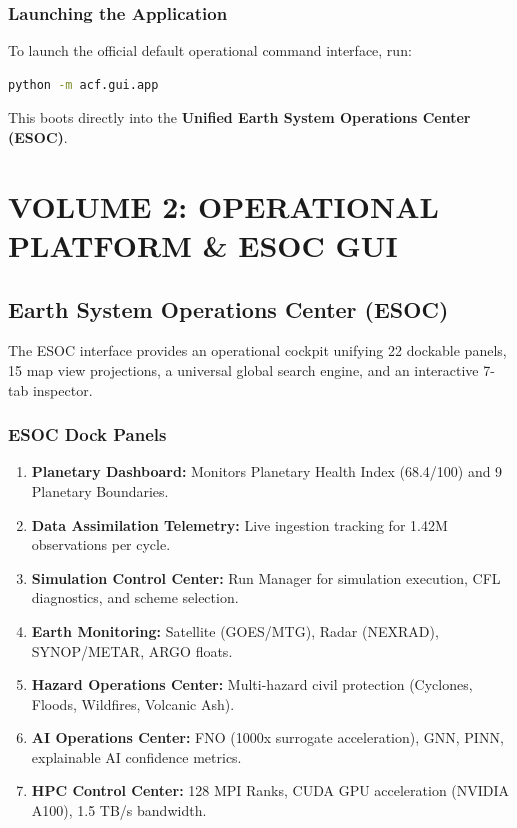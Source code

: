 \documentclass[11pt,a4paper,oneside]{report}
\begin{document}
\section{Launching the Application}
To launch the official default operational command interface, run:
\begin{lstlisting}[language=bash]
python -m acf.gui.app
\end{lstlisting}
This boots directly into the \textbf{Unified Earth System Operations Center (ESOC)}.

\part{VOLUME 2: OPERATIONAL PLATFORM \& ESOC GUI}

\chapter{Earth System Operations Center (ESOC)}
The ESOC interface provides an operational cockpit unifying 22 dockable panels, 15 map view projections, a universal global search engine, and an interactive 7-tab inspector.

\section{ESOC Dock Panels}
\begin{enumerate}
    \item \textbf{Planetary Dashboard:} Monitors Planetary Health Index (68.4/100) and 9 Planetary Boundaries.
    \item \textbf{Data Assimilation Telemetry:} Live ingestion tracking for 1.42M observations per cycle.
    \item \textbf{Simulation Control Center:} Run Manager for simulation execution, CFL diagnostics, and scheme selection.
    \item \textbf{Earth Monitoring:} Satellite (GOES/MTG), Radar (NEXRAD), SYNOP/METAR, ARGO floats.
    \item \textbf{Hazard Operations Center:} Multi-hazard civil protection (Cyclones, Floods, Wildfires, Volcanic Ash).
    \item \textbf{AI Operations Center:} FNO (1000x surrogate acceleration), GNN, PINN, explainable AI confidence metrics.
    \item \textbf{HPC Control Center:} 128 MPI Ranks, CUDA GPU acceleration (NVIDIA A100), 1.5 TB/s bandwidth.
\end{enumerate}
\end{document}
